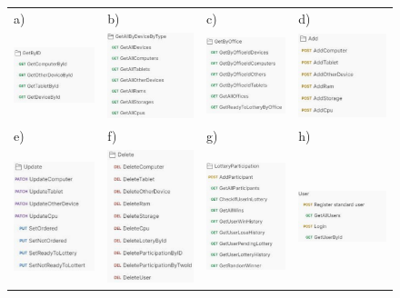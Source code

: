 \begin{figure}[htb]
  \centering
	\begin{tabular}{@{}llll@{}}
	a) & b) & c) & d) \\
	\includegraphics[width=0.17\linewidth]{rys06/struct/byid.pdf} & 
	\includegraphics[width=0.17\linewidth]{rys06/struct/alldevices.pdf} & 
	\includegraphics[width=0.17\linewidth]{rys06/struct/byOffice.pdf} & 
	\includegraphics[width=0.17\linewidth]{rys06/struct/add.pdf} \\
 
	e) & f) & g) & h)\\
	
	\includegraphics[width=0.17\linewidth]{rys06/struct/update.pdf} & 
	\includegraphics[width=0.17\linewidth]{rys06/struct/del.pdf} & 
	\includegraphics[width=0.17\linewidth]{rys06/struct/lottery.pdf} & 
	\includegraphics[width=0.17\linewidth]{rys06/struct/user.pdf} \\
 

\end{tabular}
\end{figure}
